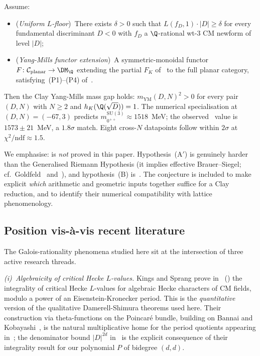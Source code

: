 \begin{conjecture}\label{conj:T4-intro}
Assume:
\begin{itemize}
\item[\textup{(A$'$)}] (\emph{Uniform $L$-floor})~There exists
$\delta > 0$ such that $L(f_D, 1) \cdot |D| \geq \delta$ for every
fundamental discriminant $D < 0$ with $f_D$ a $\Q$-rational wt-$3$
CM newform of level $|D|$;
\item[\textup{(B)}] (\emph{Yang-Mills functor extension})~A
symmetric-monoidal functor $F \colon \mathcal{C}_{\mathrm{planar}}
\to \DM_\Q$ extending the partial $F_K$ of~ to
the full planar category, satisfying~(P1)--(P4)
of~.
\end{itemize}
Then the Clay Yang-Mills mass gap holds:
$m_{\mathrm{YM}}(D, N)^2 > 0$ for every pair $(D, N)$ with
$N \geq 2$ and $h_K(\Q(\sqrt{D})) = 1$. The numerical
specialisation at $(D, N) = (-67, 3)$ predicts $m_{0^{++}}^{\mathrm{SU}(3)}
\approx 1518$~MeV; the observed~\cite{Athenodorou2021} value is
$1573 \pm 21$~MeV, a $1.8\sigma$ match. Eight cross-$N$ datapoints
follow within $2\sigma$ at $\chi^2/\mathrm{ndf} \approx 1.5$.
\end{conjecture}

We emphasise:  is \emph{not} proved in this
paper. Hypothesis~(A$'$) is genuinely harder than the Generalised
Riemann Hypothesis (it implies effective Brauer--Siegel; cf.\
Goldfeld~\cite{Goldfeld1976} and~), and
hypothesis~(B) is~. The conjecture is
included to make explicit \emph{which} arithmetic and geometric
inputs together suffice for a Clay reduction, and to identify
their numerical compatibility with lattice phenomenology.

\subsection{Position vis-\`a-vis recent literature}\label{ss:lit}
The Galois-rationality phenomena studied here sit at the
intersection of three active research threads.

\emph{(i)~Algebraicity of critical Hecke $L$-values.}
Kings and Sprang prove in~\cite{KingsSprang2025}
(\cite{KingsSprangArxiv}) the integrality of critical Hecke
$L$-values for algebraic Hecke characters of CM fields, modulo a
power of an Eisenstein-Kronecker period. This is the
\emph{quantitative} version of the qualitative Damerell-Shimura
theorems used here. Their construction via theta-functions on the
Poincar\'e bundle, building on Bannai and
Kobayashi~\cite{BannaiKobayashi2010}, is the natural multiplicative
home for the period quotients appearing in~; the
denominator bound $|D|^{2d}$ in~\Cref{thm:T1} is the explicit
consequence of their integrality result for our polynomial $P$ of
bidegree $(d, d)$.


